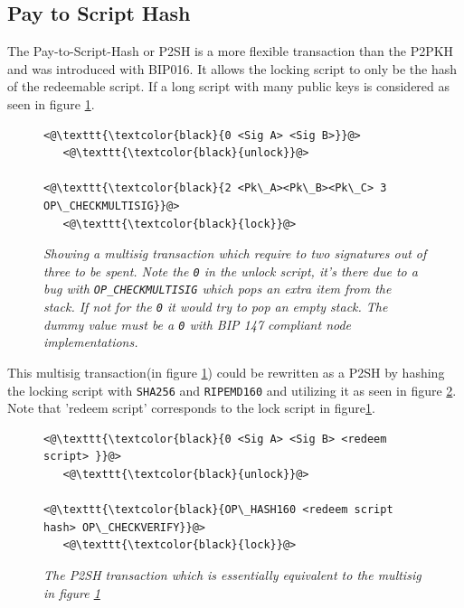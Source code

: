 \subsection{Pay to Script Hash}

The Pay-to-Script-Hash or P2SH is a more flexible transaction than the P2PKH and was introduced with BIP016\cite{bip:0016:p2sh}. It allows the locking script to only be the hash of the redeemable script. If a long script with many public keys is considered as seen in figure \ref{fig:cumbersome:script}.

\newpage

\begin{figure}
	\centering
	\begin{lstlisting}
<@\texttt{\textcolor{black}{0 <Sig A> <Sig B>}}@>   
   <@\texttt{\textcolor{black}{unlock}}@>
	
<@\texttt{\textcolor{black}{2 <Pk\_A><Pk\_B><Pk\_C> 3 OP\_CHECKMULTISIG}}@>
   <@\texttt{\textcolor{black}{lock}}@>
	\end{lstlisting}
	
	\caption{\textit{ Showing a multisig transaction which require to two signatures out of three to be spent. Note the \texttt{0} in the unlock script, it's there due to a bug with \texttt{OP\_CHECKMULTISIG} which pops an extra item from the stack. If not for the \texttt{0} it would try to pop an empty stack. The dummy value must be a \texttt{0} with BIP 147 compliant node implementations\cite{bip:0147:dummy:zero}.
	}}
	\label{fig:cumbersome:script}
\end{figure} 

This multisig transaction(in figure \ref{fig:cumbersome:script}) could be rewritten as a P2SH by hashing the locking script with \texttt{SHA256} and  \texttt{RIPEMD160} and utilizing it as seen in figure \ref{fig:p2sh}. Note that 'redeem script' corresponds to the lock script in figure\ref{fig:cumbersome:script}.

\begin{figure}[hbt!]
	
	\begin{lstlisting}
<@\texttt{\textcolor{black}{0 <Sig A> <Sig B> <redeem script> }}@>   
   <@\texttt{\textcolor{black}{unlock}}@>
	
<@\texttt{\textcolor{black}{OP\_HASH160 <redeem script hash> OP\_CHECKVERIFY}}@>
   <@\texttt{\textcolor{black}{lock}}@>
	\end{lstlisting}
	
	\caption{\textit{ The P2SH transaction which is essentially equivalent to the multisig in figure \ref{fig:cumbersome:script}
	}}
	\label{fig:p2sh}
\end{figure}

